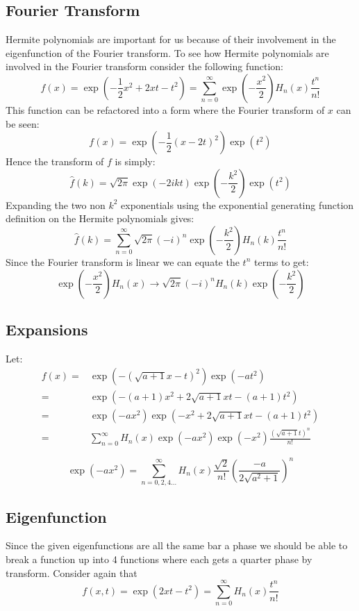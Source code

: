 \subsection{Fourier Transform}
Hermite polynomials are important for us because of their involvement in the eigenfunction of the Fourier transform.
To see how Hermite polynomials are involved in the Fourier transform consider the following function:
\[f(x) = \exp\left(-\frac{1}{2}x^2+2xt-t^2\right) = \sum_{n=0}^\infty\exp\left(-\frac{x^2}{2}\right)H_n(x)\frac{t^n}{n!}\]
This function can be refactored into a form where the Fourier transform of $x$ can be seen:
\[f(x) = \exp\left(-\frac{1}{2}(x-2t)^2\right)\exp(t^2)\]
Hence the transform of $f$ is simply:
\[\hat{f}(k) = \sqrt{2\pi}\exp(-2ikt)\exp\left(-\frac{k^2}{2}\right)\exp(t^2)\]
Expanding the two non $k^2$ exponentials using the exponential generating function definition on the Hermite polynomials gives:
\[\hat{f}(k) = \sum_{n=0}^{\infty}\sqrt{2\pi}(-i)^n\exp\left(-\frac{k^2}{2}\right)H_n(k)\frac{t^n}{n!} \]
Since the Fourier transform is linear we can equate the $t^n$ terms to get:
\[\exp\left(-\frac{x^2}{2}\right)H_n(x) \rightarrow \sqrt{2\pi}(-i)^nH_n(k)\exp\left(-\frac{k^2}{2}\right)\]

\subsection{Expansions}
Let:
\begin{equation*}
\begin{aligned}
	f(x) =& \exp(-(\sqrt{a+1}x-t)^2)\exp(-at^2) \\
	=& \exp(-(a+1)x^2+2\sqrt{a+1}xt-(a+1)t^2)\\
	=& \exp(-ax^2)\exp(-x^2+2\sqrt{a+1}xt-(a+1)t^2)\\
	=& \sum_{n=0}^{\infty}H_n(x)\exp(-ax^2)\exp(-x^2)\frac{(\sqrt{a+1}t)^n}{n!}
\end{aligned}
\end{equation*}

\[\exp(-ax^2) = \sum_{n=0,2,4...}^\infty H_n(x)\frac{\sqrt{2}}{n!}\left(\frac{-a}{2\sqrt{a^2+1}}\right)^n\]

\subsection{Eigenfunction}
Since the given eigenfunctions are all the same bar a phase we should be able to break a function up into 4 functions where each gets a quarter phase by transform.
Consider again that \[f(x,t) = \exp(2xt-t^2) = \sum_{n=0}^\infty H_n(x)\frac{t^n}{n!}\]

